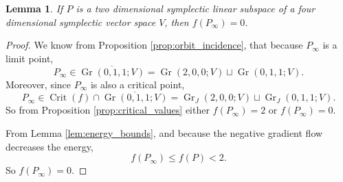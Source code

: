 \documentclass[12pt, final]{article}
\def\Crit{\operatorname{Crit}}
\def\Gr{\operatorname{Gr}}
\newtheorem{lemma}[theorem]{Lemma}
\begin{document}
\begin{lemma}
\label{lem:limit_symplectic}
If $P$ is a two dimensional symplectic linear subspace of a four dimensional symplectic vector space $V$, then $f(P_\infty) = 0$.
\end{lemma}

\begin{proof}
We know from Proposition \ref{prop:orbit_incidence}, that because $P_\infty$ is a limit point,
 \[ P_\infty \in \overline{\Gr(0, 1, 1; V)} = \Gr(2, 0, 0; V) \sqcup \Gr(0, 1, 1; V). \]
Moreover, since $P_\infty$ is also a critical point, 
 \[P_\infty \in \Crit(f) \cap \overline{\Gr(0, 1, 1; V)}= \Gr_J(2, 0, 0; V) \sqcup \Gr_J(0, 1, 1; V).\]
  So from Proposition \ref{prop:critical_values} either $f(P_\infty) = 2$ or $f(P_\infty) = 0$.
  
From Lemma \ref{lem:energy_bounds}, and because the negative gradient flow decreases the energy,
\[ f(P_\infty) \le f(P) < 2.\]
So $f(P_\infty) = 0$.
\end{proof}
\end{document}
